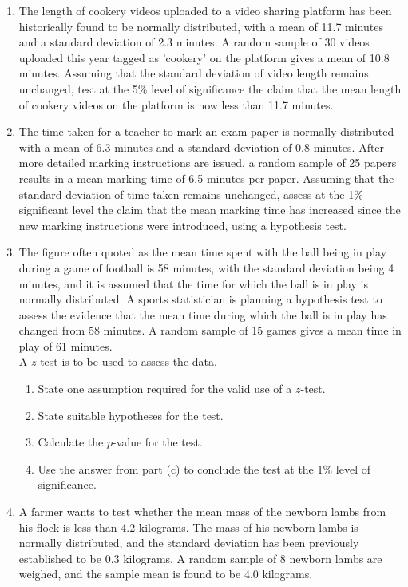 \documentclass[
  11pt,
]{book}
\begin{document}
\pagebreak

\begin{enumerate}[resume]
    \item The length of cookery videos uploaded to a video sharing platform has been historically found to be normally distributed, with a mean of 11.7 minutes and a standard deviation of 2.3 minutes. A random sample of 30 videos uploaded this year tagged as 'cookery' on the platform gives a mean of 10.8 minutes. Assuming that the standard deviation of video length remains unchanged, test at the 5\% level of significance the claim that the mean length of cookery videos on the platform is now less than 11.7 minutes.
    \item The time taken for a teacher to mark an exam paper is normally distributed with a mean of 6.3 minutes and a standard deviation of 0.8 minutes. After more detailed marking instructions are issued, a random sample of 25 papers results in a mean marking time of 6.5 minutes per paper. Assuming that the standard deviation of time taken remains unchanged, assess at the 1\% significant level the claim that the mean marking time has increased since the new marking instructions were introduced, using a hypothesis test.
    \item The figure often quoted as the mean time spent with the ball being in play during a game of football is 58 minutes, with the standard deviation being 4 minutes, and it is assumed that the time for which the ball is in play is normally distributed. A sports statistician is planning a hypothesis test to assess the evidence that the mean time during which the ball is in play has changed from 58 minutes. A random sample of 15 games gives a mean time in play of 61 minutes.\\[0.5em] A $z$-test is to be used to assess the data.
    \begin{enumerate}
        \item State one assumption required for the valid use of a $z$-test.
        \item State suitable hypotheses for the test.
        \item Calculate the $p$-value for the test.
        \item Use the answer from part (c) to conclude the test at the 1\% level of significance.
    \end{enumerate}
    \item A farmer wants to test whether the mean mass of the newborn lambs from his flock is less than 4.2 kilograms. The mass of his newborn lambs is normally distributed, and the standard deviation has been previously established to be 0.3 kilograms. A random sample of 8 newborn lambs are weighed, and the sample mean is found to be 4.0 kilograms.

\end{enumerate}
\end{document}
